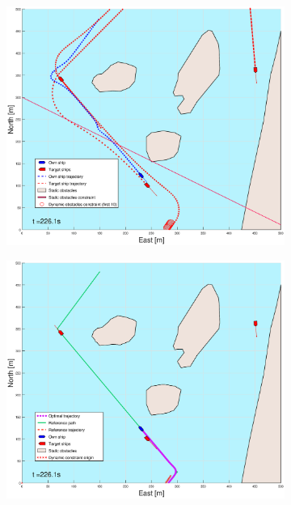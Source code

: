 \begin{figure}[ht]
\begin{subfigure}[b]{0.499\textwidth}
    \end{subfigure}
    \hfill
    \\
    \begin{subfigure}[b]{0.49\textwidth}
        \centering
        \includegraphics[width=\textwidth]{Images/Figures/Helloya_Rev/_Simple_0fig1_time=226}
    \end{subfigure}
    \hfill
    \begin{subfigure}[b]{0.499\textwidth}
        \centering
        \includegraphics[width=\textwidth]{Images/Figures/Helloya_Rev/_Simple_0fig999_time=226}

\end{subfigure}
\end{figure}
